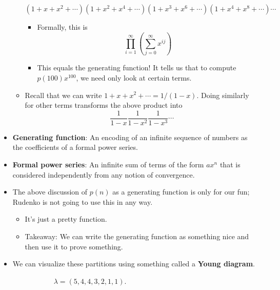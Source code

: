 \documentclass[../notes.tex]{subfiles}
\begin{document}
\begin{itemize}
\begin{itemize}
\begin{equation*}
            (1+x+x^2+\cdots)(1+x^2+x^4+\cdots)(1+x^3+x^6+\cdots)(1+x^4+x^8+\cdots)\cdots
        \end{equation*}
        \begin{itemize}
            \item Formally, this is
            \begin{equation*}
                \prod_{i=1}^\infty\left( \sum_{j=0}^\infty x^{ij} \right)
            \end{equation*}
            \item This equals the generating function! It tells us that to compute $p(100)x^{100}$, we need only look at certain terms.
        \end{itemize}
        \item Recall that we can write $1+x+x^2+\cdots=1/(1-x)$. Doing similarly for other terms transforms the above product into
        \begin{equation*}
            \frac{1}{1-x}\frac{1}{1-x^2}\frac{1}{1-x^3}\cdots
        \end{equation*}
    \end{itemize}
    \item \textbf{Generating function}: An encoding of an infinite sequence of numbers as the coefficients of a formal power series.
    \item \textbf{Formal power series}: An infinite sum of terms of the form $ax^n$ that is considered independently from any notion of convergence.
    \item The above discussion of $p(n)$ as a generating function is only for our fun; Rudenko is not going to use this in any way.
    \begin{itemize}
        \item It's just a pretty function.
        \item Takeaway: We can write the generating function as something nice and then use it to prove something.
    \end{itemize}
    \item We can visualize these partitions using something called a \textbf{Young diagram}.
    \begin{figure}[h!]
        \centering
        \begin{subfigure}[b]{0.3\linewidth}
            \centering
            \caption{$\lambda=(5,4,4,3,2,1,1)$.}
            \label{fig:youngDiagram20a}
        \end{subfigure}
        \begin{subfigure}[b]{0.3\linewidth}

\end{subfigure}
\end{figure}
\end{itemize}
\end{document}
